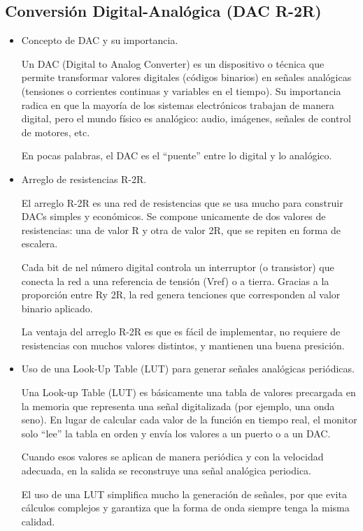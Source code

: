 \subsection{Conversión Digital-Analógica (DAC R-2R)}
\begin{itemize}
    \item Concepto de DAC y su importancia.\vspace{0.5em}
    
    Un DAC (Digital to Analog Converter) es un dispositivo o técnica que permite transformar valores digitales (códigos binarios) en señales analógicas (tensiones o corrientes continuas y variables en el tiempo). Su importancia radica en que la mayoría de los sistemas electrónicos trabajan de manera digital, pero el mundo físico es analógico: audio, imágenes, señales de control de motores, etc.
    
    En pocas palabras, el DAC es el ``puente'' entre lo digital y lo analógico.\vspace{1em}

    \item Arreglo de resistencias R-2R.\vspace{0.5em}

    El arreglo R-2R es una red de resistencias que se usa mucho para construir DACs simples y económicos. Se compone unicamente de dos valores de resistencias: una de valor R y otra de valor 2R, que se repiten en forma de escalera.
    
    Cada bit de nel número digital controla un interruptor (o transistor) que conecta la red a una referencia de tensión (Vref) o a tierra. Gracias a la proporción entre Ry 2R, la red genera tenciones que corresponden al valor binario aplicado.
    
    La ventaja del arreglo R-2R es que es fácil de implementar, no requiere de resistencias con muchos valores distintos, y mantienen una buena presición.\vspace{1em}
    
    \item Uso de una Look-Up Table (LUT) para generar señales analógicas periódicas.\vspace{0.5em}
    
    Una Look-up Table (LUT) es básicamente una tabla de valores precargada en la memoria que representa una señal digitalizada (por ejemplo, una onda seno). En lugar de calcular cada valor de la función en tiempo real, el monitor solo ``lee'' la tabla en orden y envía los valores a un puerto o a un DAC.
    
    Cuando esos valores se aplican de manera periódica y con la velocidad adecuada, en la salida se reconstruye una señal analógica periodica.
    
    El uso de una LUT simplifica mucho la generación de señales, por que evita cálculos complejos y garantiza que la forma de onda siempre tenga la misma calidad.\vspace{1em}
\end{itemize}


